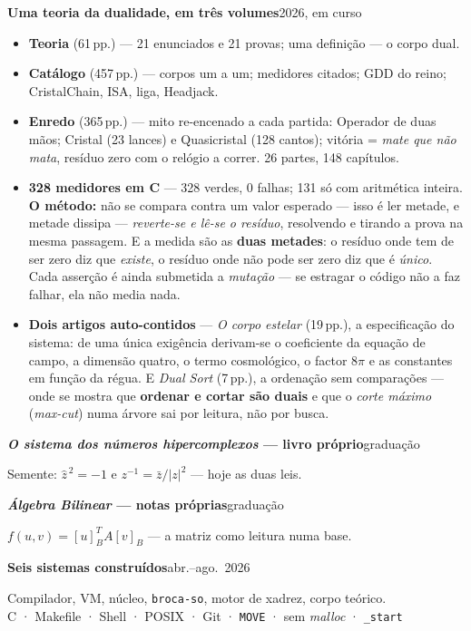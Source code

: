 \documentclass[11pt,a4paper]{article}
\newcommand{\lin}[2]{\noindent\textbf{#1}\hfill{\color{cinza}\small #2}\par}
\begin{document}
\lin{Uma teoria da dualidade, em três volumes}{2026, em curso}
\begin{itemize}
\item \textbf{Teoria} (61\,pp.) --- 21 enunciados e 21 provas; uma definição --- o corpo dual.
\item \textbf{Catálogo} (457\,pp.) --- corpos um a um; medidores citados; GDD do reino;
CristalChain, ISA, liga, Headjack.
\item \textbf{Enredo} (365\,pp.) --- mito re-encenado a cada partida: Operador de duas mãos;
Cristal (23 lances) e Quasicristal (128 cantos); vitória = \emph{mate que não mata},
resíduo zero com o relógio a correr. 26 partes, 148 capítulos.
\item \textbf{328 medidores em C} --- 328 verdes, 0 falhas; 131 só com aritmética inteira.
\textbf{O método:} não se compara contra um valor esperado --- isso é ler metade, e metade dissipa
--- \emph{reverte-se e lê-se o resíduo}, resolvendo e tirando a prova na mesma passagem. E a medida
são as \textbf{duas metades}: o resíduo onde tem de ser zero diz que \emph{existe}, o resíduo onde
não pode ser zero diz que é \emph{único}. Cada asserção é ainda submetida a \emph{mutação} --- se
estragar o código não a faz falhar, ela não media nada.
\item \textbf{Dois artigos auto-contidos} --- \emph{O corpo estelar} (19\,pp.), a especificação do
sistema: de uma única exigência derivam-se o coeficiente da equação de campo, a dimensão quatro, o
termo cosmológico, o factor $8\pi$ e as constantes em função da régua. E \emph{Dual Sort} (7\,pp.),
a ordenação sem comparações --- onde se mostra que \textbf{ordenar e cortar são duais} e que o
\emph{corte máximo} (\emph{max-cut}) numa árvore sai por leitura, não por busca.
\end{itemize}

\smallskip
\lin{\emph{O sistema dos números hipercomplexos} --- livro próprio}{graduação}
Semente: $\hat z^{\,2}=-1$ e $z^{-1}=\bar z/|z|^2$ --- hoje as duas leis.

\smallskip
\lin{\emph{Álgebra Bilinear} --- notas próprias}{graduação}
$f(u,v)=[u]^{T}_{B}A[v]_{B}$ --- a matriz como leitura numa base.

\smallskip
\lin{Seis sistemas construídos}{abr.--ago.\ 2026}
Compilador, VM, núcleo, \texttt{broca-so}, motor de xadrez, corpo teórico.
\\[1pt]
{\small\color{cinza}C · Makefile · Shell · POSIX · Git · \texttt{MOVE} · sem \emph{malloc}
· \texttt{\_start}}
\end{document}
